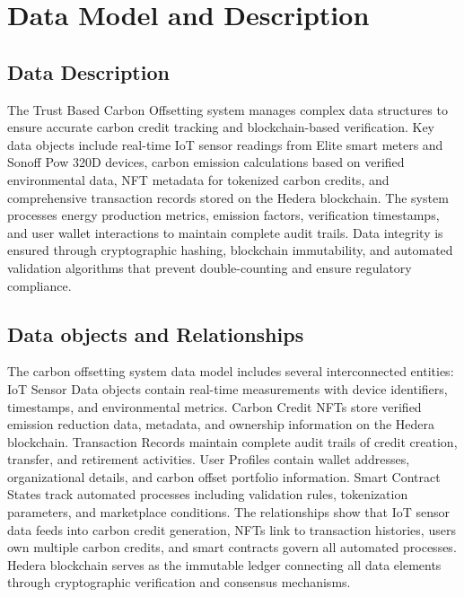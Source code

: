 \documentclass[oneside,a4paper,12pt]{book}
\begin{document}
\section{Data Model and Description}  
\subsection{Data Description}  
The Trust Based Carbon Offsetting system manages complex data structures to ensure accurate carbon credit tracking and blockchain-based verification. Key data objects include real-time IoT sensor readings from Elite smart meters and Sonoff Pow 320D devices, carbon emission calculations based on verified environmental data, NFT metadata for tokenized carbon credits, and comprehensive transaction records stored on the Hedera blockchain. The system processes energy production metrics, emission factors, verification timestamps, and user wallet interactions to maintain complete audit trails. Data integrity is ensured through cryptographic hashing, blockchain immutability, and automated validation algorithms that prevent double-counting and ensure regulatory compliance.

\subsection{Data objects and Relationships}
The carbon offsetting system data model includes several interconnected entities: IoT Sensor Data objects contain real-time measurements with device identifiers, timestamps, and environmental metrics. Carbon Credit NFTs store verified emission reduction data, metadata, and ownership information on the Hedera blockchain. Transaction Records maintain complete audit trails of credit creation, transfer, and retirement activities. User Profiles contain wallet addresses, organizational details, and carbon offset portfolio information. Smart Contract States track automated processes including validation rules, tokenization parameters, and marketplace conditions. The relationships show that IoT sensor data feeds into carbon credit generation, NFTs link to transaction histories, users own multiple carbon credits, and smart contracts govern all automated processes. Hedera blockchain serves as the immutable ledger connecting all data elements through cryptographic verification and consensus mechanisms.
\end{document}
